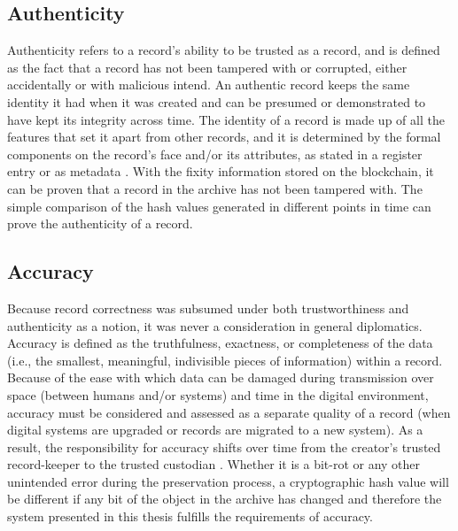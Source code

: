 \subsection{Authenticity}
Authenticity refers to a record's ability to be trusted as a record, and is defined as the fact that a record has not been tampered with or corrupted, either accidentally or with malicious intend. An authentic record keeps the same identity it had when it was created and can be presumed or demonstrated to have kept its integrity across time. The identity of a record is made up of all the features that set it apart from other records, and it is determined by the formal components on the record's face and/or its attributes, as stated in a register entry or as metadata \cite[52]{duranti2009digital}.
With the fixity information stored on the blockchain, it can be proven that a record in the archive has not been tampered with. The simple comparison of the hash values generated in different points in time can prove the authenticity of a record.

\subsection{Accuracy}
Because record correctness was subsumed under both trustworthiness and authenticity as a notion, it was never a consideration in general diplomatics. Accuracy is defined as the truthfulness, exactness, or completeness of the data (i.e., the smallest, meaningful, indivisible pieces of information) within a record. Because of the ease with which data can be damaged during transmission over space (between humans and/or systems) and time in the digital environment, accuracy must be considered and assessed as a separate quality of a record (when digital systems are upgraded or records are migrated to a new system). As a result, the responsibility for accuracy shifts over time from the creator's trusted record-keeper to the trusted custodian \cite[52]{duranti2009digital}.
Whether it is a bit-rot or any other unintended error during the preservation process, a cryptographic hash value will be different if any bit of the object in the archive has changed and therefore the system presented in this thesis fulfills the requirements of accuracy.

